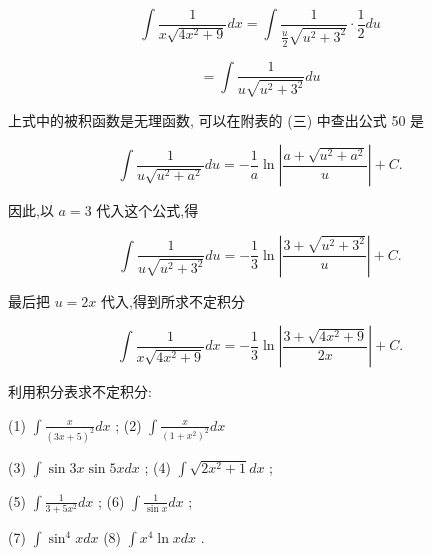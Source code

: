\documentclass[lang=cn,newtx,12pt,scheme=chinese]{elegantbook}
\begin{document}
\[
\int \frac{1}{x\sqrt{4{x}^{2} + 9}}{dx} = \int \frac{1}{\frac{u}{2}\sqrt{{u}^{2} + {3}^{2}}} \cdot \frac{1}{2}{du}
\]

\[
= \int \frac{1}{u\sqrt{{u}^{2} + {3}^{2}}}{du}
\]

上式中的被积函数是无理函数, 可以在附表的 (三) 中查出公式 50 是

\[
\int \frac{1}{u\sqrt{{u}^{2} + {a}^{2}}}{du} = - \frac{1}{a}\ln \left| \frac{a + \sqrt{{u}^{2} + {a}^{2}}}{u}\right| + C.
\]

因此,以 \(a = 3\) 代入这个公式,得

\[
\int \frac{1}{u\sqrt{{u}^{2} + {3}^{2}}}{du} = - \frac{1}{3}\ln \left| \frac{3 + \sqrt{{u}^{2} + {3}^{2}}}{u}\right| + C.
\]

最后把 \(u = {2x}\) 代入,得到所求不定积分

\[
\int \frac{1}{x\sqrt{4{x}^{2} + 9}}{dx} = - \frac{1}{3}\ln \left| \frac{3 + \sqrt{4{x}^{2} + 9}}{2x}\right| + C.
\]

\begin{problemset}[练习]

\item *利用积分表求不定积分:

(1) \(\int \frac{x}{{\left( 3x + 5\right) }^{2}}{dx}\) ; (2) \(\int \frac{x}{{\left( 1 + {x}^{2}\right) }^{2}}{dx}\)

(3) \(\int \sin {3x}\sin {5xdx}\) ; (4) \(\int \sqrt{2{x}^{2} + 1}{dx}\) ;

(5) \(\int \frac{1}{3 + 5{x}^{2}}{dx}\) ; (6) \(\int \frac{1}{\sin x}{dx}\) ;

(7) \(\int {\sin }^{4}{xdx}\) (8) \(\int {x}^{4}\ln {xdx}\) .

\end{problemset}
\end{document}
